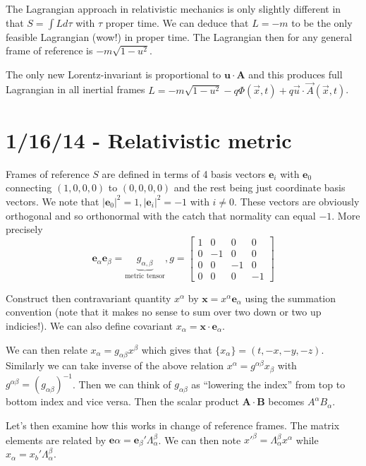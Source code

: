 \documentclass[10pt]{report}
\newcommand{\abs}[1]{\left|#1\right|}
\begin{document}
The Lagrangian approach in relativistic mechanics is only slightly different in that $S = \int L d\tau$ with $\tau$ proper time. We can deduce that $L = -m$ to be the only feasible Lagrangian (wow!) in proper time. The Lagrangian then for any general frame of reference is $-m\sqrt{1-u^2}$.

The only new Lorentz-invariant is proportional to $\mathbf{u}\cdot \mathbf{A}$ and this produces full Lagrangian in all inertial frames $L = -m\sqrt{1-u^2} - q\Phi(\vec{x},t) + q\vec{u}\cdot \vec{A}(\vec{x},t)$. 

\chapter{1/16/14 - Relativistic metric}

Frames of reference $S$ are defined in terms of 4 basis vectors $\mathbf{e}_i$ with $\mathbf{e}_0$ connecting $(1,0,0,0)$ to $(0,0,0,0)$ and the rest being just coordinate basis vectors. We note that $\abs{\mathbf{e}_0}^2 = 1, \abs{\mathbf{e}_i}^2 = -1$ with $i \neq 0$. These vectors are obviously orthogonal and so orthonormal with the catch that normality can equal $-1$. More precisely
\begin{equation}
    \mathbf{e}_\alpha\mathbf{e}_\beta = \underbrace{g_{\alpha,\beta}}_{\text{metric tensor}}, g = \begin{bmatrix} 1 & 0 & 0 & 0\\0 & -1 & 0 & 0\\0 & 0 & -1 & 0\\0 & 0 & 0 & -1 \end{bmatrix}
    \label{1.16.metric}
\end{equation}

Construct then contravariant quantity $x^\alpha$ by $\mathbf{x} = x^\alpha \mathbf{e}_\alpha$ using the summation convention (note that it makes no sense to sum over two down or two up indicies!). We can also define covariant $x_\alpha = \mathbf{x} \cdot \mathbf{e}_\alpha$. 

We can then relate $x_\alpha = g_{\alpha\beta}x^\beta$ which gives that $\{x_\alpha\} = \left( t,-x,-y,-z \right)$. Similarly we can take inverse of the above relation $x^\alpha = g^{\alpha\beta}x_\beta$ with $g^{\alpha\beta} = (g_{\alpha\beta})^{-1}$. Then we can think of $g_{\alpha\beta}$ as ``lowering the index'' from top to bottom index and vice versa. Then the scalar product $\mathbf{A}\cdot\mathbf{B}$ becomes $A^\alpha B_\alpha$. 

Let's then examine how this works in change of reference frames. The matrix elements are related by $\mathbf{e}\alpha = \mathbf{e}_\beta'\Lambda_\alpha^\beta$. We can then note $x'^\beta = \Lambda_\alpha^\beta x^\alpha$ while $x_\alpha = x_b' \Lambda_\alpha^\beta$.
\end{document}
